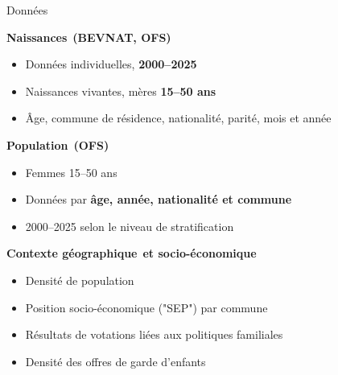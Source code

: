 \documentclass[aspectratio=169,9pt]{beamer}
\newcommand{\compresslist}{%
  \setlength{\itemsep}{2pt}%
  \setlength{\parskip}{0pt}%
  \setlength{\parsep}{0pt}%
}
\begin{document}
\begin{frame}{Données}

\begin{minipage}[t]{0.31\linewidth}
\textbf{Naissances}\
\textbf{(BEVNAT, OFS)}
\begin{itemize}\compresslist
\item Données individuelles, \textbf{2000--2025}
\item Naissances vivantes, mères \textbf{15--50 ans}
\item Âge, commune de résidence, nationalité, parité, mois et année
\end{itemize}
\end{minipage}
\hfill
\begin{minipage}[t]{0.31\linewidth}
\textbf{Population}\
\textbf{(OFS)}
\begin{itemize}\compresslist
\item Femmes 15--50 ans
\item Données par \textbf{âge, année, nationalité et commune}
\item 2000--2025 selon le niveau de stratification
\end{itemize}
\end{minipage}
\hfill
\begin{minipage}[t]{0.31\linewidth}
\textbf{Contexte géographique}\
\textbf{et socio-économique}
\begin{itemize}\compresslist
\item Densité de population
\item Position socio-économique ("SEP") par commune
\item Résultats de votations liées aux politiques familiales
\item Densité des offres de garde d'enfants
\end{itemize}
\end{minipage}

\end{frame}
\end{document}
